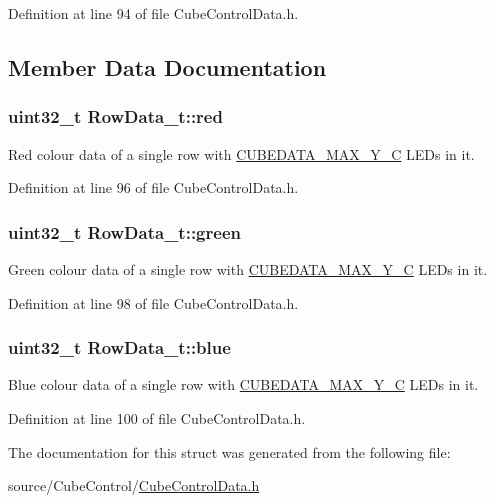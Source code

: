 Definition at line 94 of file Cube\+Control\+Data.\+h.



\subsection{Member Data Documentation}
\hypertarget{struct_row_data__t_a66675959c20cdf19aac77903a0b49e12}{}
\subsubsection[{red}]{\setlength{\rightskip}{0pt plus 5cm}uint32\+\_\+t Row\+Data\+\_\+t\+::red}\label{struct_row_data__t_a66675959c20cdf19aac77903a0b49e12}
Red colour data of a single row with \hyperlink{_cube_control_data_8h_ad81929089053d6c5d380dbbce3832272}{C\+U\+B\+E\+D\+A\+T\+A\+\_\+\+M\+A\+X\+\_\+\+Y\+\_\+\+C} L\+E\+Ds in it. 

Definition at line 96 of file Cube\+Control\+Data.\+h.

\hypertarget{struct_row_data__t_a67b2254f618fa4fc2a513eed8e3364c5}{}
\subsubsection[{green}]{\setlength{\rightskip}{0pt plus 5cm}uint32\+\_\+t Row\+Data\+\_\+t\+::green}\label{struct_row_data__t_a67b2254f618fa4fc2a513eed8e3364c5}
Green colour data of a single row with \hyperlink{_cube_control_data_8h_ad81929089053d6c5d380dbbce3832272}{C\+U\+B\+E\+D\+A\+T\+A\+\_\+\+M\+A\+X\+\_\+\+Y\+\_\+\+C} L\+E\+Ds in it. 

Definition at line 98 of file Cube\+Control\+Data.\+h.

\hypertarget{struct_row_data__t_a29e3f443c5daba5fa2aa51337b485bcb}{}
\subsubsection[{blue}]{\setlength{\rightskip}{0pt plus 5cm}uint32\+\_\+t Row\+Data\+\_\+t\+::blue}\label{struct_row_data__t_a29e3f443c5daba5fa2aa51337b485bcb}
Blue colour data of a single row with \hyperlink{_cube_control_data_8h_ad81929089053d6c5d380dbbce3832272}{C\+U\+B\+E\+D\+A\+T\+A\+\_\+\+M\+A\+X\+\_\+\+Y\+\_\+\+C} L\+E\+Ds in it. 

Definition at line 100 of file Cube\+Control\+Data.\+h.



The documentation for this struct was generated from the following file\+:\begin{DoxyCompactItemize}
\item 
source/\+Cube\+Control/\hyperlink{_cube_control_data_8h}{Cube\+Control\+Data.\+h}\end{DoxyCompactItemize}
